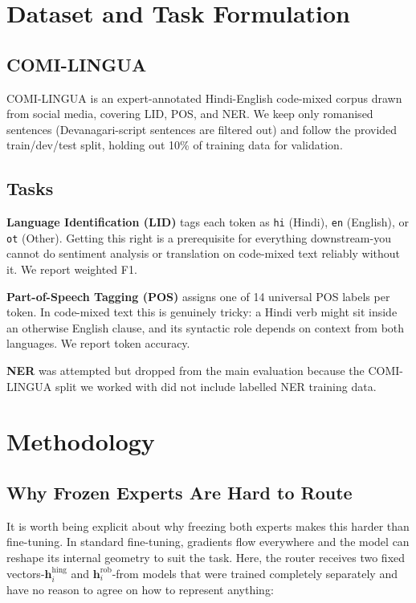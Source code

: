 \documentclass[conference]{IEEEtran}
\begin{document}
\section{Dataset and Task Formulation}

\subsection{COMI-LINGUA}

COMI-LINGUA \cite{sheth2024comilingua} is an expert-annotated Hindi-English code-mixed corpus drawn from social media, covering LID, POS, and NER. We keep only romanised sentences (Devanagari-script sentences are filtered out) and follow the provided train/dev/test split, holding out 10\% of training data for validation.

\subsection{Tasks}

\textbf{Language Identification (LID)} tags each token as \texttt{hi} (Hindi), \texttt{en} (English), or \texttt{ot} (Other). Getting this right is a prerequisite for everything downstream-you cannot do sentiment analysis or translation on code-mixed text reliably without it. We report weighted F1.

\textbf{Part-of-Speech Tagging (POS)} assigns one of 14 universal POS labels per token. In code-mixed text this is genuinely tricky: a Hindi verb might sit inside an otherwise English clause, and its syntactic role depends on context from both languages. We report token accuracy.

\textbf{NER} was attempted but dropped from the main evaluation because the COMI-LINGUA split we worked with did not include labelled NER training data.

\section{Methodology}

\subsection{Why Frozen Experts Are Hard to Route}

It is worth being explicit about why freezing both experts makes this harder than fine-tuning. In standard fine-tuning, gradients flow everywhere and the model can reshape its internal geometry to suit the task. Here, the router receives two fixed vectors-$\mathbf{h}^{\text{hing}}_i$ and $\mathbf{h}^{\text{rob}}_i$-from models that were trained completely separately and have no reason to agree on how to represent anything:
\end{document}
